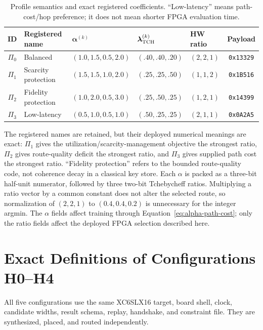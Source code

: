 \begin{table}[H]
\centering
\scriptsize
\caption{Profile semantics and exact registered coefficients. ``Low-latency''
means path-cost/hop preference; it does not mean shorter FPGA evaluation time.}
\label{tab:profile-codebook}
\begin{tabularx}{\textwidth}{@{}c p{2.4cm} p{3.2cm} p{2.5cm} p{1.8cm} c@{}}
\toprule
\textbf{ID} & \textbf{Registered name} & $\boldsymbol\alpha^{(k)}$ &
$\boldsymbol\lambda_{\rm TCH}^{(k)}$ & \textbf{HW ratio} & \textbf{Payload}\\
\midrule
$\Pi_0$ & Balanced & $(1.0,1.5,0.5,2.0)$ & $(.40,.40,.20)$ & $(2,2,1)$ &
\texttt{0x13329}\\
$\Pi_1$ & Scarcity protection & $(1.5,1.5,1.0,2.0)$ &
$(.25,.25,.50)$ & $(1,1,2)$ & \texttt{0x1B516}\\
$\Pi_2$ & Fidelity protection & $(1.0,2.0,0.5,3.0)$ &
$(.25,.50,.25)$ & $(1,2,1)$ & \texttt{0x14399}\\
$\Pi_3$ & Low-latency & $(0.5,1.0,0.5,1.0)$ &
$(.50,.25,.25)$ & $(2,1,1)$ & \texttt{0x0A2A5}\\
\bottomrule
\end{tabularx}
\end{table}

The registered names are retained, but their deployed numerical meanings are exact:
$\Pi_1$ gives the utilization/scarcity-management objective the strongest ratio,
$\Pi_2$ gives route-quality deficit the strongest ratio, and $\Pi_3$ gives supplied
path cost the strongest ratio. ``Fidelity protection'' refers to the bounded
route-quality code, not coherence decay in a classical key store. Each $\alpha$ is
packed as a three-bit half-unit numerator, followed by three two-bit Tchebycheff
ratios. Multiplying a ratio vector by a common constant does not alter the selected
route, so normalization of $(2,2,1)$ to $(0.4,0.4,0.2)$ is unnecessary for the
integer argmin. The $\alpha$ fields affect training through
Equation~\eqref{eq:alpha-path-cost}; only the ratio fields affect the deployed FPGA
selection described here.

\section{Exact Definitions of Configurations H0--H4}

All five configurations use the same XC6SLX16 target, board shell, clock, candidate
widths, result schema, replay, handshake, and constraint file. They are synthesized,
placed, and routed independently.

